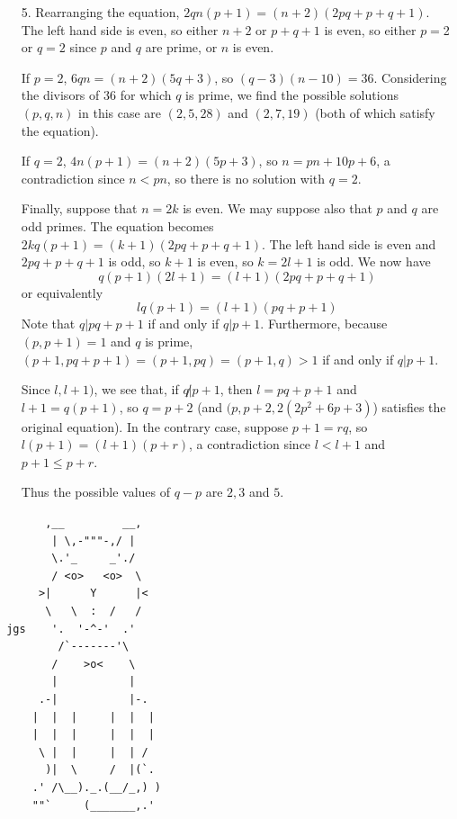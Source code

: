 \documentclass[a4paper, 12pt]{article}
\begin{document}
\begin{enumerate}
    
    \item[5.] Rearranging the equation, $2qn(p + 1) = (n + 2)(2pq + p + q + 1)$. The left hand side is even, so either $n + 2$ or $p + q + 1$ is even, so either $p = $2 or $q = 2$ since $p$ and $q$ are prime, or $n$ is even.
    
    If $p = 2$, $6qn = (n + 2)(5q + 3)$, so $(q - 3)(n - 10) = 36$. Considering the divisors of $36$ for which $q$ is prime, we find the possible solutions $(p, q, n)$ in this case are $(2, 5, 28)$ and $(2, 7, 19)$ (both of which satisfy the equation).
    
    If $q = 2$, $4n(p + 1) = (n + 2)(5p + 3)$, so $n = pn + 10p + 6$, a contradiction since $n < pn$, so there is no solution with $q = 2$.
    
    Finally, suppose that $n = 2k$ is even. We may suppose also that $p$ and $q$ are odd primes. The equation becomes $2kq(p + 1) = (k + 1)(2pq + p + q + 1)$. The left hand side is even and $2pq + p + q + 1$ is odd, so $k + 1$ is even, so $k = 2l + 1$ is odd. We now have
    $$ q(p + 1)(2l + 1) = (l + 1)(2pq + p + q + 1) $$
    or equivalently
    $$ lq(p + 1) = (l + 1)(pq + p + 1) $$
    Note that $q | pq + p + 1$ if and only if $q | p + 1$. Furthermore, because $(p, p + 1) = 1$ and $q$ is prime, $(p + 1, pq + p + 1) = (p + 1, pq) = (p + 1, q) > 1$ if and only if $q | p + 1$.
    
    Since $l, l+ 1)$, we see that, if $q \not | p + 1$, then $l = pq + p + 1$ and $l + 1 = q(p + 1)$, so $q = p + 2$ (and $(p, p + 2, 2(2p^2 + 6p + 3)$) satisfies the original equation). In the contrary case, suppose $p + 1 = rq$, so $l(p + 1) = (l + 1)(p + r)$, a contradiction since $l < l + 1$ and $p + 1 \leq p + r$.
    
    Thus the possible values of $q - p$ are $2, 3$ and $5$.

\end{enumerate}


\centering
\begin{BVerbatim}
       ,__         __,
        | \,-"""-,/ |
        \.'_     _'./
        / <o>   <o>  \
      >|      Y      |<
       \   \  :  /   /
 jgs    '.  '-^-'  .'
         /`-------'\
        /    >o<    \
        |           |
      .-|           |-.
     |  |  |     |  |  |
     |  |  |     |  |  |
      \ |  |     |  | /
       )|  \     /  |(`.
     .' /\__)._.(__/_,) )
     ""`     (_______,.'
\end{BVerbatim}
\end{document}
